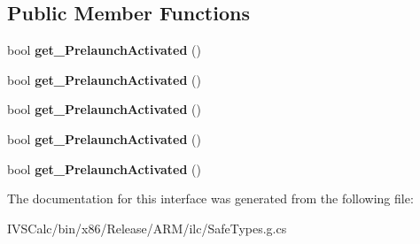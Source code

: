 \subsection*{Public Member Functions}
\begin{DoxyCompactItemize}
\item 
\mbox{\label{interface_windows_1_1_application_model_1_1_activation_1_1_i_prelaunch_activated_event_args_a9479568ee3a6133819ee8fd4148c01ea}} 
bool {\bfseries get\+\_\+\+Prelaunch\+Activated} ()
\item 
\mbox{\label{interface_windows_1_1_application_model_1_1_activation_1_1_i_prelaunch_activated_event_args_a9479568ee3a6133819ee8fd4148c01ea}} 
bool {\bfseries get\+\_\+\+Prelaunch\+Activated} ()
\item 
\mbox{\label{interface_windows_1_1_application_model_1_1_activation_1_1_i_prelaunch_activated_event_args_a9479568ee3a6133819ee8fd4148c01ea}} 
bool {\bfseries get\+\_\+\+Prelaunch\+Activated} ()
\item 
\mbox{\label{interface_windows_1_1_application_model_1_1_activation_1_1_i_prelaunch_activated_event_args_a9479568ee3a6133819ee8fd4148c01ea}} 
bool {\bfseries get\+\_\+\+Prelaunch\+Activated} ()
\item 
\mbox{\label{interface_windows_1_1_application_model_1_1_activation_1_1_i_prelaunch_activated_event_args_a9479568ee3a6133819ee8fd4148c01ea}} 
bool {\bfseries get\+\_\+\+Prelaunch\+Activated} ()
\end{DoxyCompactItemize}


The documentation for this interface was generated from the following file\+:\begin{DoxyCompactItemize}
\item 
I\+V\+S\+Calc/bin/x86/\+Release/\+A\+R\+M/ilc/Safe\+Types.\+g.\+cs\end{DoxyCompactItemize}
